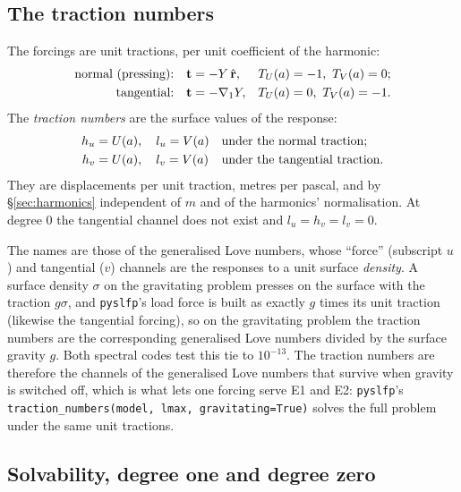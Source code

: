 \documentclass[11pt]{article}
\numberwithin{equation}{section}
\newcommand{\vt}{\mathbf{t}}
\newcommand{\rhat}{\hat{\mathbf{r}}}
\newcommand{\code}[1]{\texttt{#1}}
\newcommand{\gradone}{\nabla_{1}}
\begin{document}
\subsection{The traction numbers}
\label{sec:e1-numbers}

The forcings are unit tractions, per unit coefficient of the harmonic:
\begin{align}
  \text{normal (pressing):}&\quad \vt = -Y\,\rhat, &
    T_U(a)&=-1,\ T_V(a)=0; \notag\\
  \text{tangential:}&\quad \vt = -\gradone Y, &
    T_U(a)&=0,\ T_V(a)=-1.
\end{align}
The \emph{traction numbers} are the surface values of the response:
\begin{align}
  h_u &= U(a),\quad l_u = V(a) && \text{under the normal traction}; \notag\\
  h_v &= U(a),\quad l_v = V(a) && \text{under the tangential traction}.
\end{align}
They are displacements per unit traction, metres per pascal, and by
\S\ref{sec:harmonics} independent of $m$ and of the harmonics'
normalisation. At degree 0 the tangential channel does not exist and
$l_u=h_v=l_v=0$.

The names are those of the generalised Love numbers, whose ``force''
(subscript $u$) and tangential ($v$) channels are the responses to a unit
surface \emph{density}. A surface density $\sigma$ on the gravitating problem
presses on the surface with the traction $g\sigma$, and \code{pyslfp}'s load
force is built as exactly $g$ times its unit traction (likewise the
tangential forcing), so on the gravitating problem the traction numbers are
the corresponding generalised Love numbers divided by the surface gravity
$g$. Both spectral codes test this tie to $10^{-13}$. The traction numbers
are therefore the channels of the generalised Love numbers that survive
when gravity is switched off, which is what lets one forcing serve E1 and
E2: \code{pyslfp}'s \code{traction\_numbers(model, lmax,
gravitating=True)} solves the full problem under the same unit tractions.

\subsection{Solvability, degree one and degree zero}
\label{sec:e1-solvability}
\end{document}
